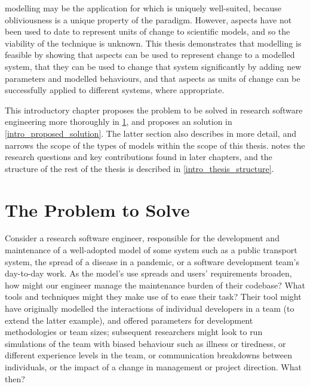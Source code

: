 \Aspectoriented{} modelling may be the application for which \aop{} is uniquely
well-suited, because obliviousness is a unique property of the paradigm.
However, aspects have not been used to date to represent units of change to
scientific models, and so the viability of the technique is unknown. This thesis
demonstrates that \aspectoriented{} modelling is feasible by showing that
aspects can be used to represent change to a modelled system, that they can be
used to change that system significantly by adding new parameters and modelled
behaviours, and that aspects as units of change can be successfully applied to
different systems, where appropriate.

This introductory chapter proposes the problem to be solved in research software
engineering more thoroughly in \cref{intro_problem_to_solve}, and proposes an
\aspectoriented{} solution in \cref{intro_proposed_solution}. The latter section
also describes \aop{} in more detail, and narrows the scope of the types of
models within the scope of this thesis.  notes the
research questions and key contributions found in later chapters, and the
structure of the rest of the thesis is described in
\cref{intro_thesis_structure}.



\section{The Problem to Solve}
\label{intro_problem_to_solve}

Consider a research software engineer, responsible for the development and
maintenance of a well-adopted model of some \sociotechnical system such as a
public transport system, the spread of a disease in a pandemic, or a software
development team's day-to-day work. As the model's use spreads and users'
requirements broaden, how might our engineer manage the maintenance burden of
their codebase? What tools and techniques might they make use of to ease their
task? Their tool might have originally modelled the interactions of individual
developers in a team (to extend the latter example), and offered parameters for
development methodologies or team sizes; subsequent researchers might look to
run simulations of the team with biased behaviour such as illness or tiredness,
or different experience levels in the team, or communication breakdowns between
individuals, or the impact of a change in management or project direction. What
then?

